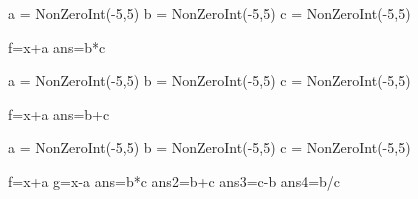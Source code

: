 \begin{sagesilent}
a = NonZeroInt(-5,5)
b = NonZeroInt(-5,5)
c = NonZeroInt(-5,5)

f=x+a
ans=b*c
\end{sagesilent}


\begin{sagesilent}
a = NonZeroInt(-5,5)
b = NonZeroInt(-5,5)
c = NonZeroInt(-5,5)

f=x+a
ans=b+c
\end{sagesilent}


\begin{sagesilent}
a = NonZeroInt(-5,5)
b = NonZeroInt(-5,5)
c = NonZeroInt(-5,5)

f=x+a
g=x-a
ans=b*c
ans2=b+c
ans3=c-b
ans4=b/c

\end{sagesilent}

